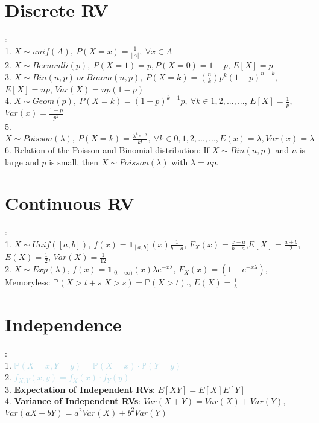 \documentclass[twocolumn]{article}
\newcommand{\sectionspace}{\vspace*{1em}}
\newcommand{\discrete}[1]{\textbf{\textcolor{lightblue}{#1}}}
\newcommand{\continuous}[1]{\textbf{\textcolor{lightblue}{#1}}}
\begin{document}
\section{Discrete RV}
:\\
1. $X \sim unif(A), \ P(X = x) = \frac{1}{|A|} ,\ \forall x \in A$\\
2. $X \sim Bernoulli(p) ,\ P(X = 1) = p, P(X = 0) = 1 - p$, $E[X] = p$\\
3. $X \sim Bin(n, p) \ or \ Binom(n, p) ,\ P(X = k) = \binom{n}{k} p^k (1-p)^{n-k}$, $E[X] = np$, $Var(X) = np(1-p)$\\
4. $X \sim Geom(p) ,\ P(X = k) = (1-p)^{k-1} p ,\ \forall k \in {1,2,...,...}$, $E[X] = \frac{1}{p}$, $Var(x) = \frac{1-p}{p^2}$\\
5. $X \sim Poisson(\lambda) ,\ P(X = k) = \frac{\lambda^k e^{-\lambda}}{k!} ,\ \forall k \in {0,1,2,...,...}, E(x) = \lambda, Var(x) = \lambda$\\
6. Relation of the Poisson and Binomial distribution: If $X \sim Bin(n, p)$ and $n$ is large and $p$ is small, then $X \sim Poisson(\lambda)$ with $\lambda = np$.

\sectionspace
\sectionspace

\section{Continuous RV}
:\\

1. $X \sim Unif ([a, b]), \ f(x) = \mathbf{1}_{[a,b]}(x)\frac{1}{b-a}$, $F_{X}(x) = \frac{x-a}{b-a}$,$E[X] = \frac{a+b}{2}$, $E(X) = \frac{1}{2}$, $Var(X) = \frac{1}{12}$\\
2. $X \sim Exp (\lambda)$, $f(x) = \mathbf{1}_{[0, +\infty)}(x)\lambda e^{-x\lambda}$, $F_{X}(x) = (1 - e^{-x\lambda})$, Memoryless: $ \mathbb{P}(X > t + s|X > s) =\mathbb{P} (X > t) .$, $E(X)= \frac{1}{\lambda}$

\sectionspace

\section{Independence}
:\\
1. \discrete{$\mathbb{P}(X = x , Y = y ) = \mathbb{P}(X = x ) \cdot \mathbb{P}(Y = y)$}\\
2. \continuous{$f_{X,Y}(x,y)=f_{X}(x) \cdot f_{Y}(y)$}\\
3. \textbf{Expectation of Independent RVs}: $E[XY] = E[X]E[Y]$\\
4. \textbf{Variance of Independent RVs}: $Var(X + Y) = Var(X) + Var(Y)$, $Var(aX+bY) = a^2Var(X) + b^2Var(Y)$
\end{document}
